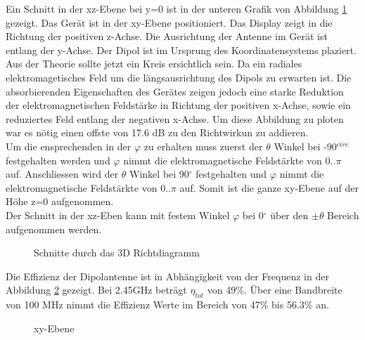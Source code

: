 Ein Schnitt in der xz-Ebene bei y=0 ist in der unteren Grafik von Abbildung \ref{fig:Schnittgemessen} gezeigt. Das Gerät ist in der xy-Ebene positioniert. Das Display zeigt in die Richtung der positiven z-Achse. Die Ausrichtung der Antenne im Gerät ist entlang der y-Achse. Der Dipol ist im Ursprung des Koordinatensystems plaziert. Aus der Theorie sollte jetzt ein Kreis ersichtlich sein. Da ein radiales elektromagetisches Feld um die längsausrichtung des Dipols zu erwarten ist. Die absorbierenden Eigenschaften des Gerätes zeigen jedoch eine starke Reduktion der elektromagnetischen Feldstärke in Richtung der positiven x-Achse, sowie ein reduziertes Feld entlang der negativen x-Achse. Um diese Abbildung zu ploten war es nötig einen offste von 17.6 dB zu den Richtwirkun zu addieren.\\
Um die ensprechenden in der $\varphi$ zu erhalten muss zuerst der $\theta$ Winkel bei -90$^{circ}$ festgehalten werden und $\varphi$ nimmt die elektromagnetische Feldstärkte von $0..\pi$ auf. Anschliessen wird der $\theta$ Winkel bei 90$^{\circ}$ festgehalten  und $\varphi$ nimmt die elektromagnetische Feldstärkte von $0..\pi$ auf. Somit ist die ganze xy-Ebene auf der Höhe z=0 aufgenommen.\\
Der Schnitt in der xz-Eben kann mit festem Winkel $\varphi$ bei 0$^{\circ}$ über den  $\pm \theta$ Bereich aufgenommen werden.
\begin{figure}[!h]
	\centering
	\begingroup
	
	\endgroup
	\caption{Schnitte durch das 3D Richtdiagramm}
	\label{fig:Schnittgemessen}
\end{figure}
\newpage
Die Effizienz der Dipolantenne ist in Abhängigkeit von der Frequenz in der Abbildung \ref{fig:Effizienz_gemessen} gezeigt. Bei 2.45GHz beträgt $\eta_{tot}$ von 49$\%$. Über eine Bandbreite von 100 MHz nimmt die Effizienz Werte im Bereich von 47$\%$ bis 56.3$\%$ an.\\
\begin{figure}[!h]
	\centering
	\begingroup
	
	\endgroup
	\caption{xy-Ebene}\label{fig:Effizienz_gemessen}
\end{figure}




